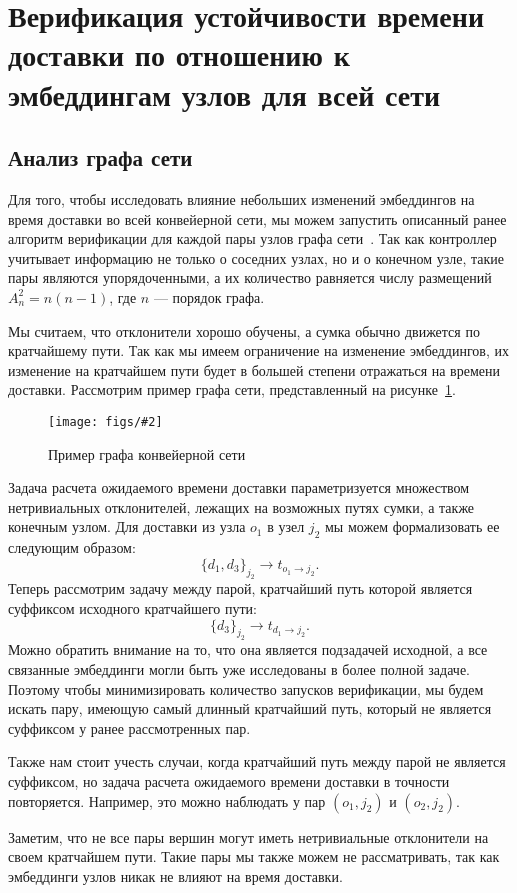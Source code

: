 \documentclass[a4paper]{article}
\newcommand{\fig}[3][1]{
    \begin{figure}[H]
        \centering
        \texttt{[image: figs/\#2]}
        \caption{#3}\label{#2}
    \end{figure}
}
\begin{document}
\section{Верификация устойчивости времени доставки по отношению к эмбеддингам
узлов для всей сети}

\subsection{Анализ графа сети}

Для того, чтобы исследовать влияние небольших изменений эмбеддингов на время
доставки во всей конвейерной сети, мы можем запустить описанный ранее алгоритм
верификации для каждой пары узлов графа сети~\cite{edt-bound-verif}. Так как
контроллер учитывает информацию не только о соседних узлах, но и о конечном
узле, такие пары являются упорядоченными, а их количество равняется числу
размещений $A_n^2 = n(n-1)$, где $n$ --- порядок графа.

Мы считаем, что отклонители хорошо обучены, а сумка обычно движется по
кратчайшему пути. Так как мы имеем ограничение на изменение эмбеддингов,
их изменение на кратчайшем пути будет в большей степени отражаться на времени
доставки. Рассмотрим пример графа сети, представленный на
рисунке~\ref{example-graph}.

\fig[.3]{example-graph}{Пример графа конвейерной сети}

Задача расчета ожидаемого времени доставки параметризуется множеством
нетривиальных отклонителей, лежащих на возможных путях сумки, а также конечным
узлом. Для доставки из узла $o_1$ в узел $j_2$ мы можем формализовать ее
следующим образом:
\[
    \{d_1, d_3\}_{j_2} \to t_{o_1 \to j_2}.
\]
Теперь рассмотрим задачу между парой, кратчайший путь которой является
суффиксом исходного кратчайшего пути:
\[
    \{d_3\}_{j_2} \to t_{d_1 \to j_2}.
\]
Можно обратить внимание на то, что она является подзадачей исходной, а все
связанные эмбеддинги могли быть уже исследованы в более полной задаче. Поэтому
чтобы минимизировать количество запусков верификации, мы будем искать пару,
имеющую самый длинный кратчайший путь, который не является суффиксом у ранее
рассмотренных пар.

Также нам стоит учесть случаи, когда кратчайший путь между парой не является
суффиксом, но задача расчета ожидаемого времени доставки в точности
повторяется. Например, это можно наблюдать у пар $(o_1, j_2)$ и $(o_2, j_2)$.

Заметим, что не все пары вершин могут иметь нетривиальные отклонители на своем
кратчайшем пути. Такие пары мы также можем не рассматривать, так как эмбеддинги
узлов никак не влияют на время доставки.
\end{document}
